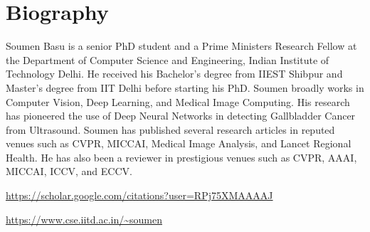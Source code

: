 
\chapter*{Biography}

Soumen Basu is a senior PhD student and a Prime Ministers Research Fellow at the Department of Computer Science and Engineering, Indian Institute of Technology Delhi. He received his Bachelor's degree from IIEST Shibpur and Master's degree from IIT Delhi before starting his PhD. Soumen broadly works in Computer Vision, Deep Learning, and Medical Image Computing. His research has pioneered the use of Deep Neural Networks in detecting Gallbladder Cancer from Ultrasound. Soumen has published several research articles in reputed venues such as CVPR, MICCAI, Medical Image Analysis, and Lancet Regional Health. He has also been a reviewer in prestigious venues such as CVPR, AAAI, MICCAI, ICCV, and ECCV.

%
\url{https://scholar.google.com/citations?user=RPj75XMAAAAJ}

%
\url{https://www.cse.iitd.ac.in/~soumen}